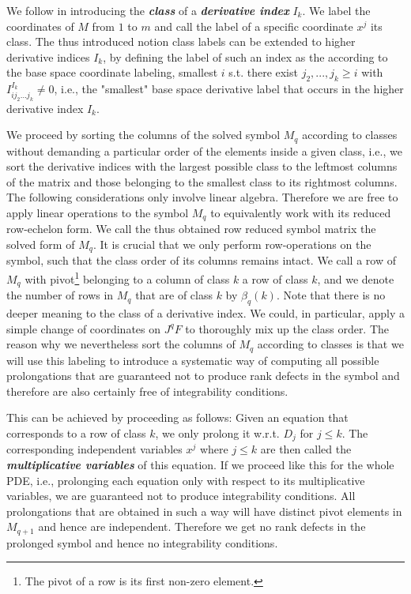 We follow \cite{seiler1994analysis} in introducing the \textit{\textbf{class}} of a \textit{\textbf{derivative index}} $I_k$. We label the coordinates of $M$ from $1$ to $m$ and call the label of a specific coordinate $x^j$ its class. The thus introduced notion class labels can be extended to higher derivative indices $I_k$, by defining the label of such an index as the according to the base space coordinate labeling, smallest $i$ s.t. there exist $j_2,...,j_k\geq i$ with $I^{I_k}_{ij_2...j_k} \neq 0$, i.e., the "smallest" base space derivative label that occurs in the higher derivative index $I_k$.

We proceed by sorting the columns of the solved symbol $M_q$ according to classes without demanding a particular order of the elements inside a given class, i.e., we sort the derivative indices with the largest possible class to the leftmost columns of the matrix and those belonging to the smallest class to its rightmost columns.
The following considerations only involve linear algebra. Therefore we are free to apply linear operations to the symbol $M_q$ to equivalently work with its reduced row-echelon form. We call the thus obtained row reduced symbol matrix the solved form of $M_q$. 
It is crucial that we only perform row-operations on the symbol, such that the class order of its columns remains intact.
We call a row of $M_q$ with pivot\footnote{The pivot of a row is its first non-zero element.} belonging to a column of class $k$ a row of class $k$, and we denote the number of rows in $M_q$ that are of class $k$ by $\beta_q(k)$. Note that there is no deeper meaning to the class of a derivative index. We could, in particular, apply a simple change of coordinates on $J^qF$ to thoroughly mix up the class order. The reason why we nevertheless sort the columns of $M_q$ according to classes is that we will use this labeling to introduce a systematic way of computing all possible prolongations that are guaranteed not to produce rank defects in the symbol and therefore are also certainly free of integrability conditions.

This can be achieved by proceeding as follows:
Given an equation that corresponds to a row of class $k$, we only prolong it w.r.t. $D_j$ for  $j \leq k$. The corresponding independent variables $x^j$ where $j \leq k$ are then called the \textbf{\textit{multiplicative variables}} of this equation. If we proceed like this for the whole PDE, i.e., prolonging each equation only with respect to its multiplicative variables, we are guaranteed not to produce integrability conditions. All prolongations that are obtained in such a way will have distinct pivot elements in $M_{q+1}$ and hence are independent. Therefore we get no rank defects in the prolonged symbol and hence no integrability conditions.

